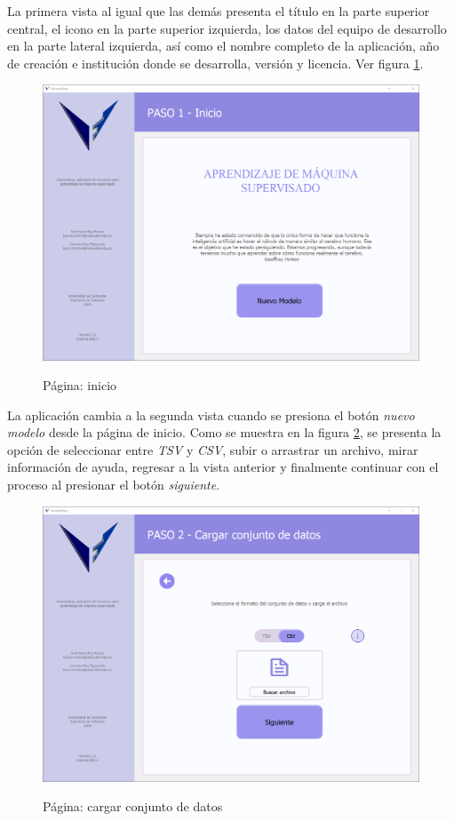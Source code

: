 La primera vista al igual que las demás presenta el título en la parte superior central, el icono en la parte superior izquierda, los datos del equipo de desarrollo en la parte lateral izquierda, así como el nombre completo de la aplicación, año de creación e institución donde se desarrolla, versión y licencia. Ver figura \ref{fig:home}.

\begin{figure}[H]
    \centering
    \caption{Página: inicio}
    \includegraphics[width=\textwidth]{views/home.png}
    \label{fig:home}
\end{figure}

La aplicación cambia a la segunda vista cuando se presiona el botón \textit{nuevo modelo} desde la página de inicio. Como se muestra en la figura \ref{fig:loaddataset}, se presenta la opción de seleccionar entre \textit{TSV} y \textit{CSV}, subir o arrastrar un archivo, mirar información de ayuda, regresar a la vista anterior y finalmente continuar con el proceso al presionar el botón \textit{siguiente}.

\begin{figure}[H]
    \centering
    \caption{Página: cargar conjunto de datos}
    \includegraphics[width=\textwidth]{views/load_dataset.png}
    \label{fig:loaddataset}
\end{figure}


